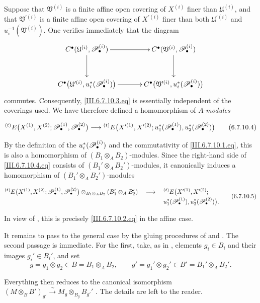 \begin{env}[6.7.10]
Suppose that $\mathfrak V^{(i)}$ is a finite affine open covering
of $X^{(i)}$ finer than $\mathfrak U^{(i)}$, and that
$\mathfrak V^{\prime(i)}$ is a finite affine open covering of
$X^{\prime(i)}$ finer than both $\mathfrak U^{\prime(i)}$ and
$u_i^{-1}(\mathfrak V^{(i)})$.  One verifies immediately that the
diagram
\[
\xymatrix@C=34pt@R=30pt{
  C^\bullet(\mathfrak U^{(i)},\sh P_\bullet^{(i)})
  \ar[r]\ar[d]
  &
  C^\bullet(\mathfrak V^{(i)},\sh P_\bullet^{(i)})
  \ar[d]
  \\
  C^\bullet
  \bigl(
    \mathfrak U^{\prime(i)},u_i^*(\sh P_\bullet^{(i)})
  \bigr)
  \ar[r]
  &
  C^\bullet
  \bigl(
    \mathfrak V^{\prime(i)},u_i^*(\sh P_\bullet^{(i)})
  \bigr)
}
\]
commutes.  Consequently, \eqref{III.6.7.10.3.eq} is essentially
independent of the coverings used.  We have therefore defined a
homomorphism of $A$-\emph{modules}
\begin{env}[6.7.10.4]
\label{III.6.7.10.4}
\[
  {}^{(t)}E
  \bigl(
    X^{(1)},X^{(2)};
    \mathscr{P}_\bullet^{(1)},\mathscr{P}_\bullet^{(2)}
  \bigr)
  \longrightarrow
  {}^{(t)}E
  \bigl(
    X^{\prime(1)},X^{\prime(2)};
    u_1^*(\mathscr{P}_\bullet^{(1)}),
    u_2^*(\mathscr{P}_\bullet^{(2)})
  \bigr)
  \tag{6.7.10.4}\label{III.6.7.10.4.eq}
\]
\end{env}
By the definition of the $u_i^*(\mathscr{P}_\bullet^{(i)})$ and the
commutativity of \eqref{III.6.7.10.1.eq}, this is also a
homomorphism of $(B_1\otimes_AB_2)$-modules.  Since the right-hand
side of \eqref{III.6.7.10.4.eq} consists of
$(B_1'\otimes_AB_2')$-modules, it canonically induces a
homomorphism of $(B_1'\otimes_AB_2')$-modules
\begin{env}[6.7.10.5]
\label{III.6.7.10.5}
\[
\begin{split}
  {}^{(t)}E
  \bigl(
    X^{(1)},X^{(2)};
    \mathscr{P}_\bullet^{(1)},\mathscr{P}_\bullet^{(2)}
  \bigr)
  \otimes_{B_1\otimes_AB_2}
  (B_1'\otimes_AB_2')
  \quad\longrightarrow\quad{}&
  {}^{(t)}E
  \bigl(
    X^{\prime(1)},X^{\prime(2)};
\\[-2pt]
    &u_1^*(\mathscr{P}_\bullet^{(1)}),
    u_2^*(\mathscr{P}_\bullet^{(2)})
  \bigr).
\end{split}
\tag{6.7.10.5}\label{III.6.7.10.5.eq}
\]
\end{env}
In view of , this is precisely
\eqref{III.6.7.10.2.eq} in the affine case.

It remains to pass to the general case by the gluing procedures of
 and .  The second passage is
immediate.  For the first, take, as in , elements
$g_i\in B_i$ and their images $g_i'\in B_i'$, and set
\[
  g=g_1\otimes g_2\in B=B_1\otimes_AB_2,
  \qquad
  g'=g_1'\otimes g_2'\in B'=B_1'\otimes_AB_2'.
\]


Everything then reduces to the canonical isomorphism $(M\otimes_BB')_{g'}
\xrightarrow{\sim}
M_g\otimes_{B_g}B_{g'}'$
.  The details are left to the reader.
\end{env}

